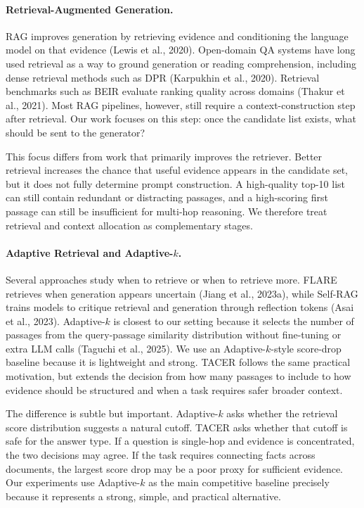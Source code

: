 \documentclass[11pt]{article}
\begin{document}
\paragraph{Retrieval-Augmented Generation.}
RAG improves generation by retrieving evidence and conditioning the language model on that evidence (Lewis et al., 2020). Open-domain QA systems have long used retrieval as a way to ground generation or reading comprehension, including dense retrieval methods such as DPR (Karpukhin et al., 2020). Retrieval benchmarks such as BEIR evaluate ranking quality across domains (Thakur et al., 2021). Most RAG pipelines, however, still require a context-construction step after retrieval. Our work focuses on this step: once the candidate list exists, what should be sent to the generator?

This focus differs from work that primarily improves the retriever. Better retrieval increases the chance that useful evidence appears in the candidate set, but it does not fully determine prompt construction. A high-quality top-10 list can still contain redundant or distracting passages, and a high-scoring first passage can still be insufficient for multi-hop reasoning. We therefore treat retrieval and context allocation as complementary stages.

\paragraph{Adaptive Retrieval and Adaptive-$k$.}
Several approaches study when to retrieve or when to retrieve more. FLARE retrieves when generation appears uncertain (Jiang et al., 2023a), while Self-RAG trains models to critique retrieval and generation through reflection tokens (Asai et al., 2023). Adaptive-$k$ is closest to our setting because it selects the number of passages from the query-passage similarity distribution without fine-tuning or extra LLM calls (Taguchi et al., 2025). We use an Adaptive-$k$-style score-drop baseline because it is lightweight and strong. TACER follows the same practical motivation, but extends the decision from how many passages to include to how evidence should be structured and when a task requires safer broader context.

The difference is subtle but important. Adaptive-$k$ asks whether the retrieval score distribution suggests a natural cutoff. TACER asks whether that cutoff is safe for the answer type. If a question is single-hop and evidence is concentrated, the two decisions may agree. If the task requires connecting facts across documents, the largest score drop may be a poor proxy for sufficient evidence. Our experiments use Adaptive-$k$ as the main competitive baseline precisely because it represents a strong, simple, and practical alternative.
\end{document}
